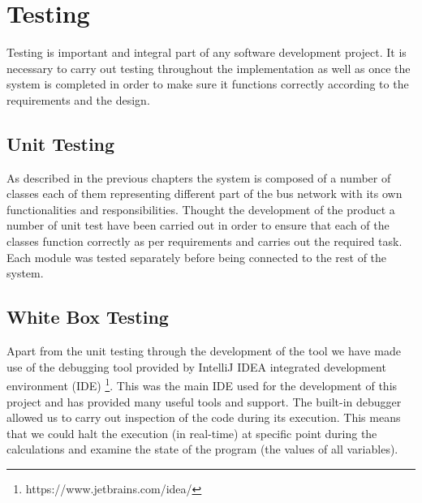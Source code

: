 \chapter{Testing}
Testing is important and integral part of any software development project. It is necessary to carry out testing throughout the implementation as well as once the system is completed in order to make sure it functions correctly according to the requirements and the design.

\section{Unit Testing} 
As described in the previous chapters the system is composed of a number of classes each of them representing different part of the bus network with its own functionalities and responsibilities. Thought the development of the product a number of unit test have been carried out in order to ensure that each of the classes function correctly as per requirements and carries out the required task. Each module was tested separately before being connected to the rest of the system.

\section{White Box Testing}
Apart from the unit testing through the development of the tool we have made use of the debugging tool provided by IntelliJ IDEA integrated development environment (IDE) \footnote{https://www.jetbrains.com/idea/}. This was the main IDE used for the development of this project and has provided many useful tools and support. The built-in debugger allowed us to carry out inspection of the code during its execution. This means that we could halt the execution (in real-time) at specific point during the calculations and examine the state of the program (the values of all variables).


